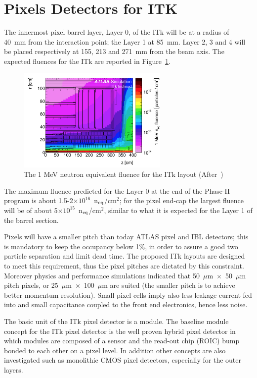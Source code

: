 \section{Pixels Detectors for ITK}
\label{sec:ITkPixels}

The innermost pixel barrel layer, Layer 0, of the ITk will be at a radius of  40~mm from the interaction 
point; the Layer 1 at 85~mm. 
Layer 2, 3 and 4 will be placed respectively at 155, 213 and 271~mm from the beam axis. 
The expected fluences for the ITk are reported in Figure~\ref{fig:ITk_Fluence}.

\begin{figure}[!htpb]
\centering
\includegraphics[width=0.65\textwidth]{ITk_Fluence.png}
\caption{\label{fig:ITk_Fluence} The 1 MeV neutron equivalent fluence  for the ITk layout 
(After~\cite{ITkStripsTDR})}
\end{figure}

The maximum fluence predicted for the Layer 0 at the end of the Phase-II program is about 1.5-2$\times10^{16}$~n$_{\rm eq}$/cm$^2$; for the pixel end-cap the largest fluence will be  of about 
5$\times10^{15}$~n$_{\rm eq}$/cm$^2$, similar to what it is expected for the Layer 1 of the barrel section.

Pixels will have a smaller pitch than today ATLAS pixel and IBL detectors; this is mandatory to keep  the 
occupancy below 1\%, in order to assure a good two particle separation and limit dead time. 
The proposed ITk layouts are designed to meet this requirement, thus the pixel pitches 
are dictated by this constraint. 
Moreover physics and performance simulations indicated that   50~$\mu$m~$\times$~50~$\mu$m pitch 
pixels, or 25~$\mu$m~$\times$~100~$\mu$m are suited (the smaller pitch is to achieve better 
momentum resolution).
Small pixel cells imply also less leakage current fed into and small capacitance coupled to the front end 
electronics, hence less noise. 


The basic  unit of the ITk pixel detector is a module. The baseline module concept for the ITk pixel detector is the well proven hybrid pixel detector in which modules are composed of a sensor and the read-out chip (ROIC) bump bonded to each other on a pixel level. In addition other concepts are also investigated such as monolithic CMOS pixel detectors, especially for the outer layers.





